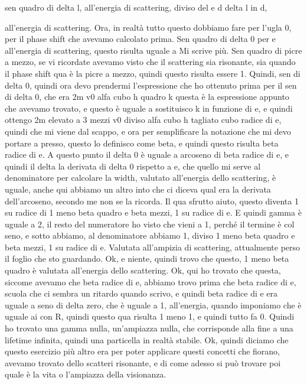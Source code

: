 \begin{soluzione}
{sen quadro di delta l, all'energia di scattering, diviso del e d delta l in d,
   
   all'energia di scattering. Ora, in realtà tutto questo dobbiamo fare per l'ugla 0, per il phase shift che avevamo calcolato prima. Sen quadro di delta 0 per e all'energia di scattering, questo risulta uguale a Mi scrive più. Sen quadro di picre a mezzo, se vi ricordate avevamo visto che il scattering sia risonante, sia quando il phase shift qua è la picre a mezzo, quindi questo risulta essere 1. Quindi, sen di delta 0, quindi ora devo prendermi l'espressione che ho ottenuto prima per il sen di delta 0, che era 2m v0 alfa cubo h quadro k questa è la espressione appunto che avevamo trovato, e questo è uguale a sostituisco k in funzione di e, e quindi ottengo 2m elevato a 3 mezzi v0 diviso alfa cubo h tagliato cubo radice di e, quindi che mi viene dal scappo, e ora per semplificare la notazione che mi devo portare a presso, questo lo definisco come beta, e quindi questo risulta beta radice di e. A questo punto il delta 0 è uguale a arcoseno di beta radice di e, e quindi il delta la derivata di delta 0 rispetto a e, che quello mi serve al denominatore per calcolare la width, valutato all'energia dello scattering, è uguale, anche qui abbiamo un altro into che ci diceva qual era la derivata dell'arcoseno, secondo me non se la ricorda. Il qua sfrutto aiuto, questo diventa 1 su radice di 1 meno beta quadro e beta mezzi, 1 su radice di e. E quindi gamma è uguale a 2, il resto del numeratore ho visto che vieni a 1, perché il termine è col seno, e sotto abbiamo, al denominatore abbiamo 1, diviso 1 meno beta quadro e beta mezzi, 1 su radice di e. Valutata all'ampizia di scattering, attualmente perso il foglio che sto guardando. Ok, e niente, quindi trovo che questo, 1 meno beta quadro è valutata all'energia dello scattering. Ok, qui ho trovato che questa, siccome avevamo che beta radice di e, abbiamo trovo prima che beta radice di e, scuola che ci sembra un ritardo quando scrivo, e quindi beta radice di e era uguale a seno di delta zero, che è uguale a 1, all'energia, quando imponiamo che è uguale ai con R, quindi questo qua risulta 1 meno 1, e quindi tutto fa 0. Quindi ho trovato una gamma nulla, un'ampiazza nulla, che corrisponde alla fine a una lifetime infinita, quindi una particella in realtà stabile. Ok, quindi diciamo che questo esercizio più altro era per poter applicare questi concetti che fiorano, avevamo trovato dello scatteri risonante, e di come adesso si può trovare poi quale è la vita o l'ampiazza della visionanza.

}
\end{soluzione}
